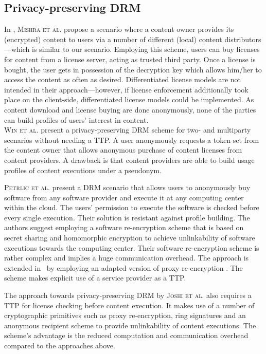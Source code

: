 \documentclass{llncs}
\begin{document}
\subsection{Privacy-preserving DRM}

In \cite{multilevel}, \textsc{Mishra et al.} propose a scenario where a content owner provides its (encrypted) content to users via a number of different (local) content distributors---which is similar to our scenario. Employing this scheme, users can buy licenses for content from a license server, acting as trusted third party. Once a license is bought, the user gets in possession of the decryption key which allows him/her to access the content as often as desired. Differentiated license models are not intended in their approach---however, if license enforcement additionally took place on the client-side, differentiated license models could be implemented. As content download and license buying are done anonymously, none of the parties can build profiles of users' interest in content.\\

\textsc{Win et al.} \cite{nottp} present a privacy-preserving DRM scheme for two- and multiparty scenarios without needing a TTP. A user anonymously requests a token set from the content owner that allows anonymous purchase of content licenses from content providers. A drawback is that content providers are able to build usage profiles of content executions under a pseudonym. 

\textsc{Petrlic et al.} \cite{petrlic1} present a DRM scenario that allows users to anonymously buy software from any software provider and execute it at any computing center within the cloud. The users' permission to execute the software is checked before every single execution. Their solution is resistant against profile building. The authors suggest employing a software re-encryption scheme that is based on secret sharing and homomorphic encryption to achieve unlinkability of software executions towards the computing center. Their software re-encryption scheme is rather complex and implies a huge communication overhead. The approach is extended in~\cite{proxy} by employing an adapted version of proxy re-encryption \cite{ateniese_improved}. The scheme makes explicit use of a service provider as a TTP. 


The approach towards privacy-preserving DRM by \textsc{Joshi et al.} \cite{practical} also requires a TTP for license checking before content execution. It makes use of a number of cryptographic primitives such as proxy re-encryption, ring signatures and an anonymous recipient scheme to provide unlinkability of content executions. The scheme's advantage is the reduced computation and communication overhead compared to the approaches above. 
\end{document}
